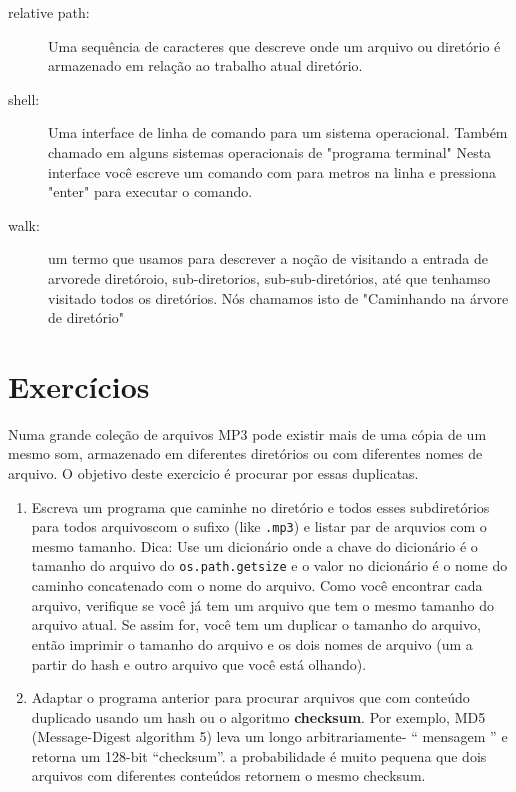 \documentclass{book}
\begin{document}
\begin{description}
\item[relative path:] Uma sequência de caracteres que descreve onde um arquivo ou
diretório é armazenado em relação ao trabalho atual diretório.

\item[shell:] Uma interface de linha de comando para um sistema operacional.
Também chamado em alguns sistemas operacionais de "programa terminal"
Nesta interface você escreve um comando com para metros na linha e pressiona "enter" 
para executar o comando.

\item[walk:] um termo que usamos para descrever  a noção de visitando
a entrada de arvorede diretóroio, sub-diretorios, sub-sub-diretórios,
até que tenhamso visitado todos os diretórios. 
Nós chamamos isto  de "Caminhando na árvore de diretório"

\end{description}

\section{Exercícios}


\label{checksum}


Numa grande coleção de arquivos MP3 pode existir mais de uma 
cópia de um mesmo som, armazenado em diferentes diretórios ou com 
diferentes nomes de arquivo. O objetivo deste exercicio é 
procurar por essas duplicatas.

\begin{enumerate}

\item Escreva um programa que caminhe no diretório e todos esses
subdiretórios para todos arquivoscom o sufixo (like {\tt .mp3})
e listar par de arquvios com o mesmo tamanho.
Dica: Use um dicionário onde a chave do dicionário é o tamanho
do arquivo do {\tt os.path.getsize} e o valor no
dicionário é o nome do caminho concatenado com o nome do arquivo.
Como você encontrar cada arquivo, verifique se você já tem um
arquivo que tem o mesmo tamanho do arquivo atual. Se assim for, você tem um
duplicar o tamanho do arquivo, então imprimir o tamanho do arquivo e os dois nomes de arquivo
(um a partir do hash e outro arquivo que você está olhando).


\item Adaptar o programa anterior para procurar arquivos que
com conteúdo duplicado usando um hash ou o algoritmo {\bf checksum}. Por exemplo,
MD5 (Message-Digest algorithm 5) leva um longo arbitrariamente-
`` mensagem '' e retorna um 128-bit ``checksum''. a probabilidade
é muito pequena que dois arquivos com diferentes conteúdos
retornem o mesmo checksum.

\end{enumerate}
\end{document}
